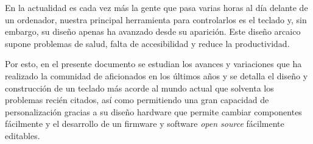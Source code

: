 En la actualidad es cada vez más la gente que pasa varias horas al día delante de un ordenador, nuestra principal herramienta para controlarlos es el teclado y, sin embargo, su diseño apenas ha avanzado desde su aparición. Este diseño arcaico supone problemas de salud, falta de accesibilidad y reduce la productividad. \vspace{0.3cm} \par

Por esto, en el presente documento se estudian los avances y variaciones que ha realizado la comunidad de aficionados en los últimos años y se detalla el diseño y construcción de un teclado más acorde al mundo actual que solventa los problemas recién citados, así como permitiendo una gran capacidad de personalización gracias a su diseño hardware que permite cambiar componentes fácilmente y el desarrollo de un firmware y software \textit{open source} fácilmente editables.

